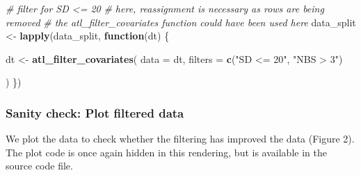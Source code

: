 \documentclass[
]{scrartcl}
\newenvironment{Shaded}{}{}
\newcommand{\CommentTok}[1]{\textcolor[rgb]{0.38,0.63,0.69}{\textit{#1}}}
\newcommand{\ControlFlowTok}[1]{\textcolor[rgb]{0.00,0.44,0.13}{\textbf{#1}}}
\newcommand{\DataTypeTok}[1]{\textcolor[rgb]{0.56,0.13,0.00}{#1}}
\newcommand{\KeywordTok}[1]{\textcolor[rgb]{0.00,0.44,0.13}{\textbf{#1}}}
\newcommand{\NormalTok}[1]{#1}
\newcommand{\StringTok}[1]{\textcolor[rgb]{0.25,0.44,0.63}{#1}}
\begin{document}
\begin{Shaded}
\begin{Highlighting}[]
\CommentTok{\# filter for SD <= 20}
\CommentTok{\# here, reassignment is necessary as rows are being removed}
\CommentTok{\# the atl\_filter\_covariates function could have been used here}
\NormalTok{data\_split <{-}}\StringTok{ }\KeywordTok{lapply}\NormalTok{(data\_split, }\ControlFlowTok{function}\NormalTok{(dt) \{}
  
\NormalTok{  dt <{-}}\StringTok{ }\KeywordTok{atl\_filter\_covariates}\NormalTok{(}
    \DataTypeTok{data =}\NormalTok{ dt,}
    \DataTypeTok{filters =} \KeywordTok{c}\NormalTok{(}\StringTok{"SD <= 20"}\NormalTok{,}
                \StringTok{"NBS > 3"}\NormalTok{)}
    
\NormalTok{  )}
\NormalTok{\})}
\end{Highlighting}
\end{Shaded}

\hypertarget{sanity-check-plot-filtered-data}{%
\subsubsection{Sanity check: Plot filtered data}\label{sanity-check-plot-filtered-data}}

We plot the data to check whether the filtering has improved the data (Figure 2).
The plot code is once again hidden in this rendering, but is available in the source code file.
\end{document}
